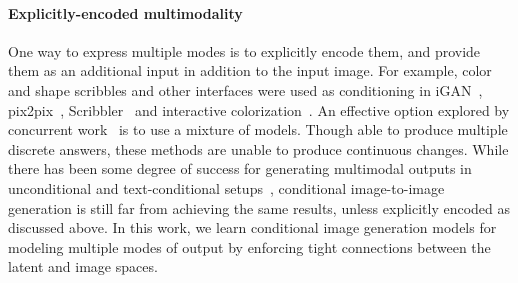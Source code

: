 \paragraph{Explicitly-encoded multimodality}
One way to express multiple modes is to explicitly encode them, and provide them as an additional input in addition to the input image.
For example, color and shape scribbles and other interfaces were used as conditioning in iGAN~\citep{zhu2016generative}, pix2pix~\citep{isola2016image}, Scribbler~\citep{sangkloy2017scribbler} and interactive colorization~\citep{zhang2017real}. An effective option explored by concurrent work~\citep{ghosh2017multi, chen2017photographic,bansal2017pixelnn} is to use a mixture of models. Though able to produce multiple discrete answers, these methods are unable to produce continuous changes.
While there has been some degree of success for generating multimodal outputs in unconditional and text-conditional setups~\citep{goodfellow2014generative,nguyen2016plug,reed2016generative,dinh2016density,larsen2016vaegan}, conditional image-to-image generation is still far from achieving the same results, unless explicitly encoded as discussed above. 
In this work, we learn conditional image generation models for modeling multiple modes of output by enforcing tight connections between the latent and image spaces.
